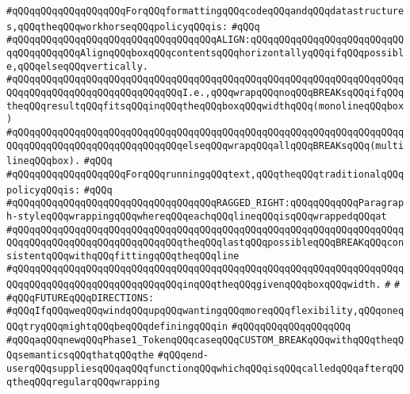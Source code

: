\verb|#qQQqqQQqqQQqqQQqqQQqForqQQqformattingqQQqcodeqQQqandqQQqdatastructures,qQQqtheqQQqworkhorseqQQqpolicyqQQqis:|\newline
\verb|#qQQq|\newline
\verb|#qQQqqQQqqQQqqQQqqQQqqQQqqQQqqQQqqQQqALIGN:qQQqqQQqqQQqqQQqqQQqqQQqqQQqqQQqqQQqqQQqAlignqQQqboxqQQqcontentsqQQqhorizontallyqQQqifqQQqpossible,qQQqelseqQQqvertically.|\newline
\verb|#qQQqqQQqqQQqqQQqqQQqqQQqqQQqqQQqqQQqqQQqqQQqqQQqqQQqqQQqqQQqqQQqqQQqqQQqqQQqqQQqqQQqqQQqqQQqqQQqqQQqI.e.,qQQqwrapqQQqnoqQQqBREAKsqQQqifqQQqtheqQQqresultqQQqfitsqQQqinqQQqtheqQQqboxqQQqwidthqQQq(monolineqQQqbox)|\newline
\verb|#qQQqqQQqqQQqqQQqqQQqqQQqqQQqqQQqqQQqqQQqqQQqqQQqqQQqqQQqqQQqqQQqqQQqqQQqqQQqqQQqqQQqqQQqqQQqqQQqqQQqelseqQQqwrapqQQqallqQQqBREAKsqQQq(multilineqQQqbox).|\newline
\verb|#qQQq|\newline
\verb|#qQQqqQQqqQQqqQQqqQQqForqQQqrunningqQQqtext,qQQqtheqQQqtraditionalqQQqpolicyqQQqis:|\newline
\verb|#qQQq|\newline
\verb|#qQQqqQQqqQQqqQQqqQQqqQQqqQQqqQQqqQQqRAGGED_RIGHT:qQQqqQQqqQQqParagraph-styleqQQqwrappingqQQqwhereqQQqeachqQQqlineqQQqisqQQqwrappedqQQqat|\newline
\verb|#qQQqqQQqqQQqqQQqqQQqqQQqqQQqqQQqqQQqqQQqqQQqqQQqqQQqqQQqqQQqqQQqqQQqqQQqqQQqqQQqqQQqqQQqqQQqqQQqqQQqtheqQQqlastqQQqpossibleqQQqBREAKqQQqconsistentqQQqwithqQQqfittingqQQqtheqQQqline|\newline
\verb|#qQQqqQQqqQQqqQQqqQQqqQQqqQQqqQQqqQQqqQQqqQQqqQQqqQQqqQQqqQQqqQQqqQQqqQQqqQQqqQQqqQQqqQQqqQQqqQQqqQQqinqQQqtheqQQqgivenqQQqboxqQQqwidth.|\newline
\verb|#|\newline
\verb|#|\newline
\verb|#qQQqFUTUREqQQqDIRECTIONS:|\newline
\verb|#qQQqIfqQQqweqQQqwindqQQqupqQQqwantingqQQqmoreqQQqflexibility,qQQqoneqQQqtryqQQqmightqQQqbeqQQqdefiningqQQqin|\newline
\verb|#qQQqqQQqqQQqqQQqqQQq|\newline
\verb|#qQQqaqQQqnewqQQqPhase1_TokenqQQqcaseqQQqCUSTOM_BREAKqQQqwithqQQqtheqQQqsemanticsqQQqthatqQQqthe|\newline
\verb|#qQQqend-userqQQqsuppliesqQQqaqQQqfunctionqQQqwhichqQQqisqQQqcalledqQQqafterqQQqtheqQQqregularqQQqwrapping|\newline
